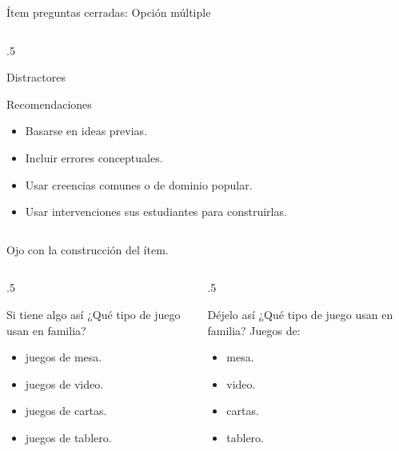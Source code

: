 \documentclass[11pt, aspectratio=169, xcolor=table,hyphens]{beamer}
\begin{document}
\begin{frame}{Ítem preguntas cerradas: Opción múltiple \cite{MIDE2021}}
\begin{columns}
\begin{column}{.5\linewidth}
{\begin{block}{Distractores}
				\end{block}
				\begin{alertblock}{Recomendaciones}
					\begin{itemize}
						\justifying
						\item Basarse en ideas previas.
						\item Incluir errores conceptuales.
						\item Usar creencias comunes o de dominio popular.
						\item Usar intervenciones sus estudiantes para construirlas.
					\end{itemize}
				\end{alertblock}
			}
		\end{column}
	\end{columns}
\end{frame}

\begin{frame}{Ojo con la construcción del ítem.}
	\begin{columns}
		\begin{column}{.5\linewidth}
			\begin{block}{Si tiene algo así}
				¿Qué tipo de juego usan en familia?
				\begin{itemize}
					\item[a)] juegos de mesa.
					\item[b)] juegos de video.
					\item[c)] juegos de cartas.
					\item[d)] juegos de tablero.
				\end{itemize}
			\end{block}
		\end{column}
		\begin{column}{.5\linewidth}
			\begin{block}{Déjelo así}
				¿Qué tipo de juego usan en familia? Juegos de:
				\begin{itemize}
					\item[a)] mesa.
					\item[b)] video.
					\item[c)] cartas.
					\item[d)] tablero.
				\end{itemize}
			\end{block}
		\end{column}
	\end{columns}
\end{frame}
\end{document}
